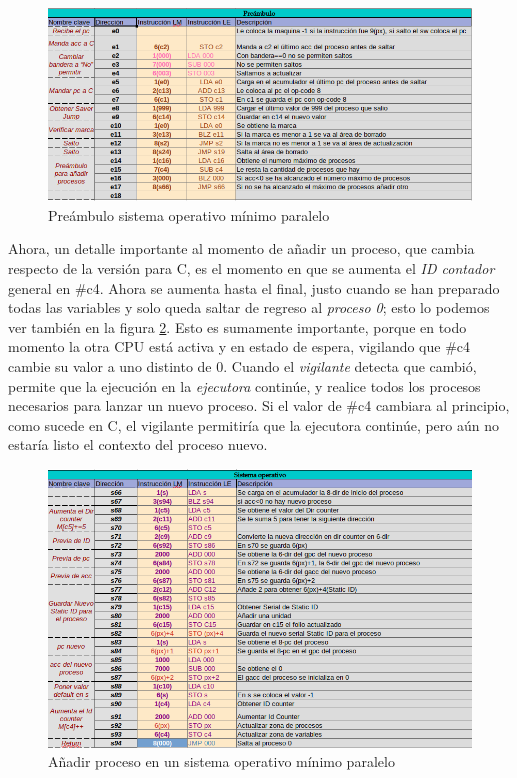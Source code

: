\documentclass[letterpaper,12pt,oneside]{book}
\begin{document}
	 		

			\begin{figure}[h]		
				\centering
				\includegraphics[scale=0.55]{media/Paralela/somp_preambulo.png}
				\caption{ Preámbulo sistema operativo mínimo paralelo}
				\label{fig:somp_preambulo}
			\end{figure}	
			
			Ahora, un detalle importante al momento de añadir un proceso, que cambia respecto de la versión para C, es el momento en que se aumenta 
			el 
			\textit{ID contador} general en \#c4. Ahora se aumenta hasta el final, justo cuando se han preparado todas las variables y solo queda
			saltar de regreso al \textit{proceso 0}; esto lo podemos ver también en la figura \ref{fig:somp_add_process}. Esto es sumamente importante, 
			porque en todo momento la 
			otra CPU está activa y en estado de espera, vigilando que
			\#c4 cambie su valor a uno distinto de 0. Cuando el \textit{vigilante} detecta que cambió, permite que la ejecución en la
			 \textit{ejecutora} continúe, y 
			 realice todos los procesos necesarios para lanzar un nuevo proceso. Si el valor de \#c4 cambiara al principio, 
			 como sucede 
			 en C, el vigilante permitiría que la ejecutora continúe, pero aún no estaría listo el contexto del proceso nuevo.
			
			
			\begin{figure}[h]		
				\centering
				\includegraphics[scale=0.57]{media/Paralela/somp_add_process.png}
				\caption{ Añadir proceso en un sistema operativo mínimo paralelo}
				\label{fig:somp_add_process}
			\end{figure}	
			
\end{document}
